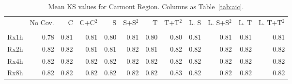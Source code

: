 \begin{table}[ht!]
\caption{Mean KS values for Carmont Region. Columns as Table~\ref{tab:aic}.}
\label{tab:ks}
\begin{tabular}{lrrrrrrrrrrr}
\toprule
 & No Cov. & C & C+C$^2$ & S & S+S$^2$ & T & T+T$^2$ & L. S & L. S+S$^2$ & L. T & L. T+T$^2$ \\
 &  &  &  &  &  &  &  &  &  &  &  \\
\midrule
Rx1h & 0.78 & 0.81 & 0.81 & 0.80 & 0.81 & 0.80 & 0.80 & 0.81 & 0.81 & 0.81 & 0.81 \\
Rx2h & 0.82 & 0.82 & 0.81 & 0.81 & 0.82 & 0.81 & 0.82 & 0.82 & 0.82 & 0.82 & 0.82 \\
Rx4h & 0.82 & 0.82 & 0.82 & 0.82 & 0.82 & 0.82 & 0.82 & 0.82 & 0.82 & 0.82 & 0.82 \\
Rx8h & 0.82 & 0.82 & 0.82 & 0.82 & 0.82 & 0.82 & 0.83 & 0.82 & 0.82 & 0.82 & 0.82 \\
\bottomrule
\end{tabular}
\end{table}

